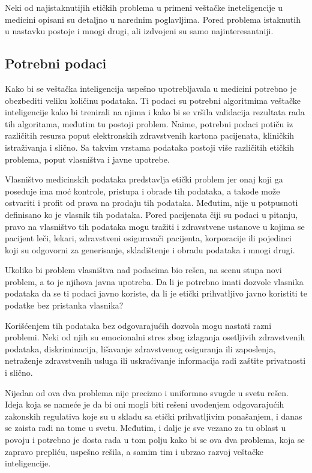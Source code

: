 \documentclass[a4paper]{article}
\begin{document}
Neki od najistaknutijih etičkih problema u primeni veštačke ineteligencije u medicini opisani su detaljno u narednim poglavljima. Pored problema istaknutih u nastavku postoje i mnogi drugi, ali izdvojeni su samo najinteresantniji.

\subsection{Potrebni podaci}
\label{subsec:poreklo_podataka}

Kako bi se veštačka inteligencija uspešno upotrebljavala u medicini potrebno je obezbediti veliku količinu podataka. Ti podaci su potrebni algoritmima veštačke inteligencije kako bi trenirali na njima i kako bi se vršila validacija rezultata rada tih algoritama, međutim tu postoji problem. Naime, potrebni podaci potiču iz različitih resursa poput elektronskih zdravstvenih kartona pacijenata, kliničkih istraživanja i slično. Sa takvim vrstama podataka postoji više različitih etičkih problema, poput vlasništva i javne upotrebe.

Vlasništvo medicinskih podataka predstavlja etički problem jer onaj koji ga poseduje ima moć kontrole, pristupa i obrade tih podataka, a takođe može ostvariti i profit od prava na prodaju tih podataka. Međutim, nije u potpusnoti definisano ko je vlasnik tih podataka. Pored pacijenata čiji su podaci u pitanju, pravo na vlasništvo tih podataka mogu tražiti i zdravstvene ustanove u kojima se pacijent leči, lekari, zdravstveni osiguravači pacijenta, korporacije ili pojedinci koji su odgovorni za generisanje, skladištenje i obradu podataka i mnogi drugi.

Ukoliko bi problem vlasništva nad podacima bio rešen, na scenu stupa novi problem, a to je njihova javna upotreba. Da li je potrebno imati dozvole vlasnika podataka da se ti podaci javno koriste, da li je etički prihvatljivo javno koristiti te podatke bez pristanka vlasnika?

Korišćenjem tih podataka bez odgovarajućih dozvola mogu nastati razni problemi. Neki od njih su emocionalni stres zbog izlaganja osetljivih zdravstvenih podataka, diskriminacija, lišavanje zdravstvenog osiguranja ili zaposlenja, netraženje zdravstvenih usluga ili uskraćivanje informacija radi zaštite privatnosti i slično.

Nijedan od ova dva problema nije precizno i uniformno svugde u svetu rešen. Ideja koja se nameće je da bi oni mogli biti rešeni uvođenjem odgovarajućih zakonskih regulativa koje su u skladu sa etički prihvatljivim ponašanjem, i danas se zaista radi na tome u svetu. Međutim, i dalje je sve vezano za tu oblast u povoju i potrebno je dosta rada u tom polju kako bi se ova dva problema, koja se zapravo prepliću, uspešno rešila, a samim tim i ubrzao razvoj veštačke inteligencije. \cite{ai_in_medicine}
\end{document}
